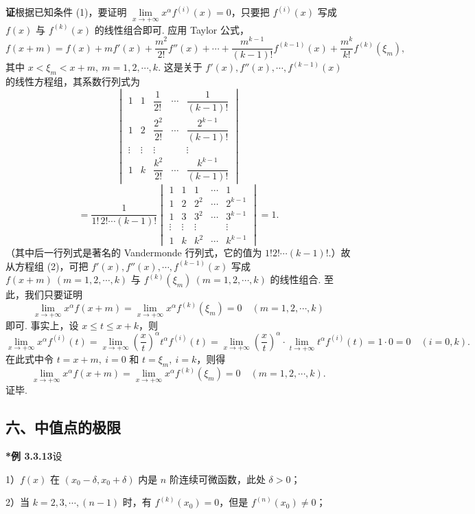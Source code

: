 \documentclass[UTF8, 12pt, fontset=fandol, oneside]{ctexart}
\begin{document}
\noindent\textbf{证}\quad 根据已知条件 (1)，要证明 $\lim\limits_{x\to+\infty}x^\alpha f^{(i)}(x)=0$，只要把 $f^{(i)}(x)$ 写成 $f(x)$ 与 $f^{(k)}(x)$ 的线性组合即可. 应用 Taylor 公式，
\[
  f(x+m)=f(x)+mf'(x)+\frac{m^2}{2!}f''(x)+\cdots
  +\frac{m^{k-1}}{(k-1)!}f^{(k-1)}(x)+\frac{m^k}{k!}f^{(k)}(\xi_m), \tag{2}
\]
其中 $x<\xi_m<x+m,\ m=1,2,\cdots,k$. 这是关于 $f'(x),f''(x),\cdots,f^{(k-1)}(x)$ 的线性方程组，其系数行列式为
\[
  \begin{vmatrix}
  1&1&\dfrac1{2!}&\cdots&\dfrac1{(k-1)!}\\
  1&2&\dfrac{2^2}{2!}&\cdots&\dfrac{2^{k-1}}{(k-1)!}\\
  \vdots&\vdots&\vdots& &\vdots\\
  1&k&\dfrac{k^2}{2!}&\cdots&\dfrac{k^{k-1}}{(k-1)!}
  \end{vmatrix}
\]
\[
  =\frac{1}{1!\,2!\cdots(k-1)!}
  \begin{vmatrix}
  1&1&1&\cdots&1\\
  1&2&2^2&\cdots&2^{k-1}\\
  1&3&3^2&\cdots&3^{k-1}\\
  \vdots&\vdots&\vdots& &\vdots\\
  1&k&k^2&\cdots&k^{k-1}
  \end{vmatrix}=1.
\]
（其中后一行列式是著名的 Vandermonde 行列式，它的值为 $1!2!\cdots(k-1)!$.）故从方程组 (2)，可把 $f'(x),f''(x),\cdots,f^{(k-1)}(x)$ 写成 $f(x+m)\ (m=1,2,\cdots,k)$ 与 $f^{(k)}(\xi_m)\ (m=1,2,\cdots,k)$ 的线性组合. 至此，我们只要证明
\[
  \lim_{x\to+\infty}x^\alpha f(x+m)=\lim_{x\to+\infty}x^\alpha f^{(k)}(\xi_m)=0\quad(m=1,2,\cdots,k)
\]
即可. 事实上，设 $x\le t\le x+k$，则
\[
  \lim_{x\to+\infty}x^\alpha f^{(i)}(t)
  =\lim_{x\to+\infty}\left(\frac{x}{t}\right)^\alpha t^\alpha f^{(i)}(t)
  =\lim_{x\to+\infty}\left(\frac{x}{t}\right)^\alpha\cdot\lim_{t\to+\infty}t^\alpha f^{(i)}(t)
  =1\cdot0=0\quad(i=0,k).
\]
在此式中令 $t=x+m,\ i=0$ 和 $t=\xi_m,\ i=k$，则得
\[
  \lim_{x\to+\infty}x^\alpha f(x+m)
  =\lim_{x\to+\infty}x^\alpha f^{(k)}(\xi_m)=0\quad(m=1,2,\cdots,k).
\]
证毕.

\subsection*{六、中值点的极限}

\noindent\textbf{*例 3.3.13}\quad 设

1）$f(x)$ 在 $(x_0-\delta,x_0+\delta)$ 内是 $n$ 阶连续可微函数，此处 $\delta>0$；

2）当 $k=2,3,\cdots,(n-1)$ 时，有 $f^{(k)}(x_0)=0$，但是 $f^{(n)}(x_0)\ne0$；
\end{document}
